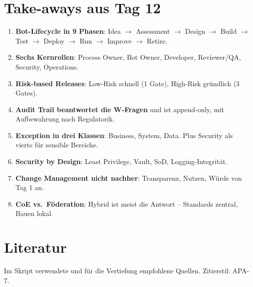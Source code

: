 \documentclass[11pt,a4paper,oneside]{article}
\begin{document}
\section{Take-aways aus Tag 12}

\begin{enumerate}
  \item \textbf{Bot-Lifecycle in 9 Phasen}: Idea $\to$ Assessment $\to$ Design $\to$ Build $\to$ Test $\to$ Deploy $\to$ Run $\to$ Improve $\to$ Retire.
  \item \textbf{Sechs Kernrollen}: Process Owner, Bot Owner, Developer, Reviewer/QA, Security, Operations.
  \item \textbf{Risk-based Releases}: Low-Risk schnell (1 Gate), High-Risk gründlich (3 Gates).
  \item \textbf{Audit Trail beantwortet die W-Fragen} und ist append-only, mit Aufbewahrung nach Regulatorik.
  \item \textbf{Exception in drei Klassen}: Business, System, Data. Plus Security als vierte für sensible Bereiche.
  \item \textbf{Security by Design}: Least Privilege, Vault, SoD, Logging-Integrität.
  \item \textbf{Change Management nicht nachher}: Transparenz, Nutzen, Würde von Tag 1 an.
  \item \textbf{CoE vs.\ Föderation}: Hybrid ist meist die Antwort -- Standards zentral, Bauen lokal.
\end{enumerate}

\clearpage
\section{Literatur}

Im Skript verwendete und für die Vertiefung empfohlene Quellen. Zitierstil: APA-7.
\end{document}
